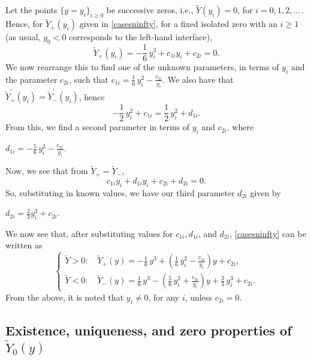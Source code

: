 \documentclass[12pt]{amsart}
\begin{document}
Let the points $\{y=y_i\}_{i \ge 0}$ be successive  zeros, i.e.,
$\tilde{Y}(y_i)=0$, for $i=0,1,2,...\,$.  Hence, for
$\tilde{Y}_+(y_i)$ given in \eqref{casesninfty}, for a fixed
isolated zero  with an  $i \ge 1$ (as usual, $y_0<0$ corresponds
to the left-hand interface),
\begin{equation*}
\mbox{$\tilde{Y}_+(y_i)=-\frac{1}{6}\,y^3_i + c_{1i}y_i + c_{2i} =
0$}.
\end{equation*}
We now rearrange this to find one of the unknown parameters, in
terms of $y_i$ and the parameter $c_{2i}$, such that
$\mbox{$c_{1i} = \frac{1}{6}\,y^2_i - \frac{c_{2i}}{y_i}$}$.
We also have that $\tilde{Y}^\prime_+(y_i)=\tilde{Y}^\prime_-(y_i)$,
hence
\begin{equation*}
\mbox{$-\frac{1}{2}\,y^2_i + c_{1i} = \frac{1}{2}\,y^2_i +
d_{1i}$}.
\end{equation*}
From this, we find a second parameter in terms of $y_i$ and
$c_{2i}$, where
 
$\mbox{$d_{1i} = -\frac{5}{6}\,y^2_i - \frac{c_{2i}}{y_i}$}$.
 
Now, we see that from $\tilde{Y}_+=\tilde{Y}_-$,
\begin{equation*}
\mbox{$c_{1i}y_i+d_{1i}y_i+c_{2i}+d_{2i} = 0$}.
\end{equation*}
So, substituting in known values, we have our third parameter
$d_{2i}$ given by
 
 $\mbox{$d_{2i} = \frac{2}{3}y_i^3 + c_{2i}$}$.
 

We now see that, after substituting values for $c_{1i}, d_{1i}$,
and $d_{2i}$, \eqref{casesninfty} can be written as
\begin{equation}
\label{ninftycasesconsts}
\begin{cases}
\tilde{Y}>0: \quad \mbox{$\tilde{Y}_+(y) =
-\frac{1}{6}\,y^3+(\frac{1}{6}\,y^2_i -
\frac{c_{2i}}{y_i})y+c_{2i}$},\\[1mm] \tilde{Y}<0: \quad
\mbox{$\tilde{Y}_-(y) = \frac{1}{6}\,y^3-(\frac{5}{6}\,y^2_i +
\frac{c_{2i}}{y_i})y+\frac{2}{3}\,y_i^3 + c_{2i}$}.
\end{cases}
\end{equation}
From the above, it is noted that $y_i\neq 0$, for any $i$, unless
$c_{2i}=0$.

{\smallskip}

 \subsection{Existence, uniqueness, and zero properties of $\tilde Y_0(y)$}
\end{document}
